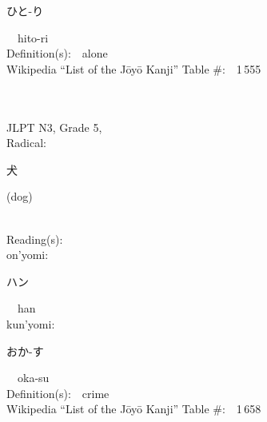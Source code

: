 \begin{multicols}{2}
{\hspace*{2em}}{\begin{CJK}{UTF8}{min} ひと-り \end{CJK}}\ \ hito-ri\ \ \\
Definition(s):\ \ alone \\
Wikipedia ``List of the J\=oy\=o Kanji'' Table \#:\ \ 1\,555 \\
\ \ \\
{\fontsize{34pt}{40pt}  }\ \ \\  %
{JLPT N3, Grade 5, \\Radical:\ \ {\begin{CJK}{UTF8}{min} 犬 \end{CJK}} (dog) } \\
Reading(s):\ \ \\
{\hspace*{1em}}on'yomi:\ \ \\
{\hspace*{2em}}{\begin{CJK}{UTF8}{min} ハン \end{CJK}}\ \ han\ \ \\
{\hspace*{1em}}kun'yomi:\ \ \\
{\hspace*{2em}}{\begin{CJK}{UTF8}{min} おか-す \end{CJK}}\ \ oka-su\ \ \\
Definition(s):\ \ crime \\
Wikipedia ``List of the J\=oy\=o Kanji'' Table \#:\ \ 1\,658 \\
\ \ \\
\end{multicols}



